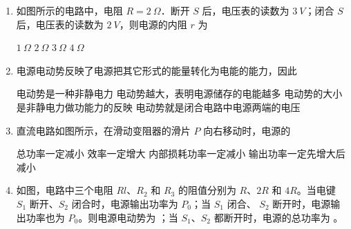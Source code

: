 \begin{enumerate}
\item
{}
如图所示的电路中，电阻 $ R=2 \ \Omega $．断开 $ S $ 后，电压表的读数为 $ 3 \ V $；闭合 $ S $
后，电压表的读数为 $ 2 \ V $，则电源的内阻 $ r $ 为  
\begin{figure}[h!]
\centering

\end{figure}


\fourchoices
{$ 1 \ \Omega $}
{$ 2 \ \Omega $}
{$ 3 \ \Omega $}
{$ 4 \ \Omega $}



\item 
{}
电源电动势反映了电源把其它形式的能量转化为电能的能力，因此  

\fourchoices
{电动势是一种非静电力}
{电动势越大，表明电源储存的电能越多}
{电动势的大小是非静电力做功能力的反映}
{电动势就是闭合电路中电源两端的电压}


\item 
{}
直流电路如图所示，在滑动变阻器的滑片 $ P $ 向右移动时，电源的  
\begin{figure}[h!]
\centering

\end{figure}


\fourchoices
{总功率一定减小}
{效率一定增大}
{内部损耗功率一定减小}
{输出功率一定先增大后减小}




\item 
{}
如图，电路中三个电阻 $ Rl $、$ R_{2} $ 和 $ R_{3} $ 的阻值分别为 $ R $、$ 2R $ 和
$ 4R $。当电键 $ S_{1} $ 断开、$ S_{2} $ 闭合时，电源输出功率为 $ P_{0} $；当 $ S_{1} $ 闭合、
$ S_{2} $ 断开时，电源输出功率也为 $ P_{0} $。则电源电动势为 \underlinegap ；当
$ S_{1} $、$ S_{2} $ 都断开时，电源的总功率为 \underlinegap 。
\begin{figure}[h!]
\centering

\end{figure}






\end{enumerate}
